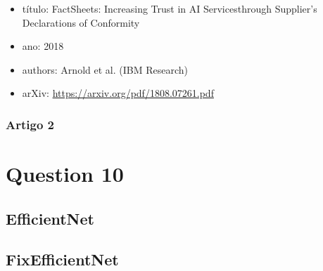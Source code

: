 \documentclass[a4paper]{article}    %
\begin{document}
\begin{itemize}
    \item título: FactSheets:  Increasing Trust in AI Servicesthrough Supplier’s Declarations of Conformity
    \item ano: 2018
    \item authors: Arnold et al. (IBM Research)
    \item arXiv: \href{https://arxiv.org/pdf/1808.07261.pdf}{https://arxiv.org/pdf/1808.07261.pdf}
\end{itemize}

\subsubsection{Artigo 2}
\newpage
\setcounter{section}{10}
\setcounter{subsection}{0}
\section*{Question 10}

\subsection{EfficientNet}

\subsection{FixEfficientNet}

\end{document}
